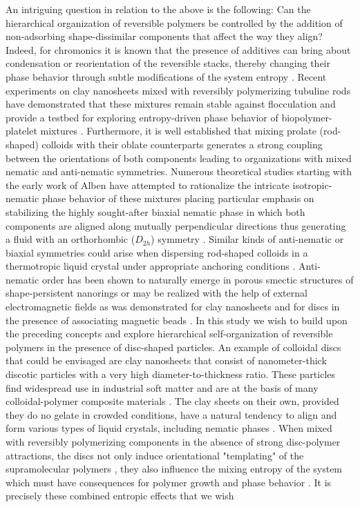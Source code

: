 An intriguing question in relation to the above is the following:  Can the hierarchical organization of reversible polymers be controlled by the addition of non-adsorbing shape-dissimilar components that affect the way they align? Indeed, for chromonics it is known that the presence of additives can bring about condensation or reorientation of the reversible stacks, thereby changing their phase behavior through subtle modifications of the system entropy \cite{tortora2010}.  Recent experiments on  clay nanosheets mixed with reversibly polymerizing tubuline rods have demonstrated that these mixtures remain stable against flocculation and provide a testbed for exploring entropy-driven phase behavior of biopolymer-platelet mixtures \cite{kato2018}.
Furthermore, it is well established that mixing prolate (rod-shaped) colloids with their  oblate  counterparts  generates a strong coupling between the  orientations of both components leading to organizations with mixed nematic and anti-nematic symmetries. Numerous theoretical studies starting with the early work of Alben \cite{alben1973} have attempted to rationalize the intricate isotropic-nematic  phase behavior of these mixtures  placing particular emphasis on stabilizing the highly sought-after biaxial nematic phase in which both components are aligned along mutually perpendicular directions thus generating a fluid with an orthorhombic ($D_{2h}$) symmetry  \cite{stroobants1984,campallenbolhuisfrenkel,sokolova1997,vanakaras1998,vanakaras2001, matsuda2003,jacksonbiaxrev,varga2002,galindo2,wensinkrodplate,wensinkbiaxial}. Similar kinds of  anti-nematic or biaxial symmetries could arise when dispersing rod-shaped colloids in a thermotropic liquid crystal under appropriate anchoring conditions \cite{matsuyama2010,mundoor2018}. Anti-nematic order has been shown to naturally emerge in porous smectic structures of  shape-persistent nanorings \cite{avendano2016,wensinkavendano2016} or may be realized with the help of external electromagnetic fields as was demonstrated for clay nanosheets \cite{dozov2011} and for discs in the presence of associating magnetic beads \cite{perouklapp2020}.  In this study we wish to build upon the preceding concepts and explore hierarchical self-organization of reversible polymers in the presence of disc-shaped particles. An example of colloidal discs that could be envisaged are clay nanosheets that consist of nanometer-thick discotic particles with a very high diameter-to-thickness ratio. These particles find widespread use in industrial soft matter and are at the basis of many colloidal-polymer composite materials \cite{balazs1998,ginzburg2000}. The clay sheets on their own, provided they do no gelate in crowded conditions,  have a natural tendency to align and form various types of liquid crystals, including nematic phases \cite{kooij1998,gabriel2005,michot2006,paineau_jpcb2009}. When mixed with  reversibly polymerizing components in the absence of strong disc-polymer attractions,  the discs not only induce orientational "templating" of the supramolecular polymers \cite{asdonk2017}, they also influence the mixing entropy of the system which must have  consequences for polymer growth and  phase behavior \cite{taylorherzfeld1991,vdschoot1994epl}. It is precisely these combined entropic effects that we wish 